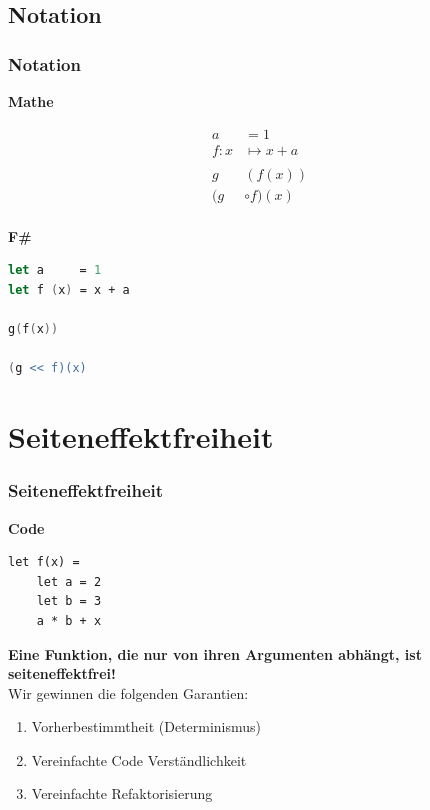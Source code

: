 \documentclass{beamer}
\begin{document}
\subsection{Notation}

\begin{frame}[fragile]
    \frametitle{Notation}
    \begin{minipage}[t]{0.5\linewidth}
        \begin{center}
            \textbf{Mathe}
        \end{center}
        \begin{align*}
a &= 1 \\
f: x &\mapsto x + a \\
\\
g&(f(x)) \\
(g& \circ f) (x) \\
        \end{align*}
    \end{minipage}%
    \begin{minipage}[t]{0.5\linewidth}
        \begin{center}
            \textbf{F\#}
        \end{center}
        \begin{lstlisting}[language=FSharp]
let a     = 1
let f (x) = x + a
            
g(f(x))
            
(g << f)(x)            
        \end{lstlisting}
\end{minipage}%
\end{frame}

\section{Seiteneffektfreiheit}

\begin{frame}[fragile]
    \frametitle{Seiteneffektfreiheit}
    \begin{minipage}[t]{0.4\linewidth}
        \begin{center}
            \textbf{Code}
        \end{center}
\begin{lstlisting}
let f(x) =
    let a = 2
    let b = 3
    a * b + x
\end{lstlisting}
    \end{minipage}%
    \begin{minipage}[t]{0.6\linewidth}
        \textbf{Eine Funktion, die nur von ihren Argumenten abhängt, ist seiteneffektfrei!} \\
        Wir gewinnen die folgenden Garantien:
    \begin{enumerate}
        \item Vorherbestimmtheit (Determinismus)
        \item Vereinfachte Code Verständlichkeit
        \item Vereinfachte Refaktorisierung
    \end{enumerate}
\end{minipage}%
\end{frame}
\end{document}
